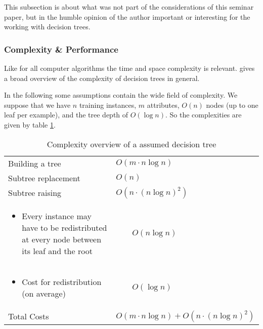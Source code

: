 This subsection is about what was not part of the considerations of this seminar paper, but in the humble opinion of the author important or interesting for the working with decision trees.

\subsubsection{Complexity \& Performance}

Like for all computer algorithms the time and space complexity is relevant. \cite{buhrman2002complexity} gives a broad overview of the complexity of decision trees in general. 

In the following some assumptions contain the wide field of complexity. We suppose that we have $n$ training instances, $m$ attributes, $O(n)$ nodes (up to one leaf per example), and the tree depth of $O(\log n)$. So the complexities are given by table \ref{tab:complexity}. %

\begin{table}[!h] \centering
\begin{tabular}{|p{6cm} | l|} \hline
Building a tree & $O(m \cdot n \log n )$ \\
Subtree replacement & $O(n)$ \\
Subtree raising & $O\left(n \cdot (n \log n)^2 \right)$ \\ 
\vspace*{-2em} \begin{itemize}\item \small{Every instance may have to be redistributed at every node
between its leaf and the root} \vspace*{-1em} \end{itemize} & $ \qquad O\left(n \log n \right)$ \\
\vspace*{-2em} \begin{itemize}\item \small{Cost for redistribution (on average)} \vspace*{-1em} \end{itemize} & $ \qquad O\left( \log n \right)$ \\ \hline \hline
Total Costs & $O(m \cdot n \log n ) + O\left(n \cdot (n \log n)^2 \right)$ \\ \hline
\end{tabular}
\caption{Complexity overview of a assumed decision tree}
\label{tab:complexity}
\end{table}

